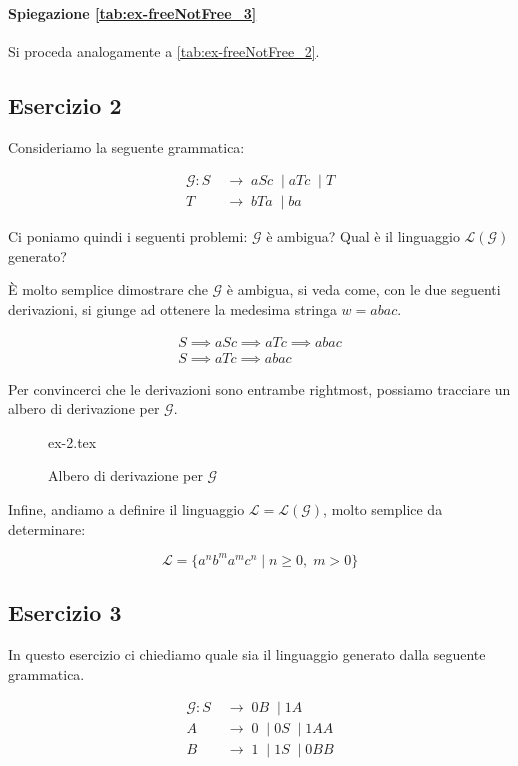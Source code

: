 \documentclass[class=book, crop=false, oneside, 12pt]{standalone}
\begin{document}
\paragraph{Spiegazione \ref{tab:ex-freeNotFree_3}}
Si proceda analogamente a \ref{tab:ex-freeNotFree_2}.

\subsection*{Esercizio 2}
Consideriamo la seguente grammatica:

\begin{align*}
  \mathcal{G}:  S\; & \to\;  aSc\; \mid aTc\; \mid T \\
   T\; & \to\; bTa\; \mid ba
\end{align*}

\noindent Ci poniamo quindi i seguenti problemi: \(\mathcal{G}\) è ambigua? Qual è il linguaggio \(\mathcal{L(G)}\) generato?

È molto semplice dimostrare che \(\mathcal{G}\) è ambigua, si veda come, con le due seguenti derivazioni, si giunge ad ottenere la medesima stringa \(w = abac\).

\begin{gather*}
  S \implies aSc \implies aTc \implies abac \\
  S \implies aTc \implies abac
\end{gather*}

\noindent Per convincerci che le derivazioni sono entrambe rightmost, possiamo tracciare un albero di derivazione per \(\mathcal{G}\).

\begin{figure}[H]
	\centering
	{ex-2.tex}
	\caption{Albero di derivazione per \(\mathcal{G}\)}
\end{figure}

\noindent Infine, andiamo a definire il linguaggio \(\mathcal{L = L(G)}\), molto semplice da determinare:

\begin{equation*}
  \mathcal{L} = \{ a^n b^m a^m c^n \mid n \geq 0,\; m > 0 \}
\end{equation*}

\subsection*{Esercizio 3}
In questo esercizio ci chiediamo quale sia il linguaggio generato dalla seguente grammatica.

\begin{align*}
  \mathcal{G}: S\; &\to\; 0B\; \mid 1A \\
  A\; &\to\; 0\; \mid 0S\; \mid 1AA \\
  B\; &\to\; 1\; \mid 1S\; \mid 0BB
\end{align*}
\end{document}

